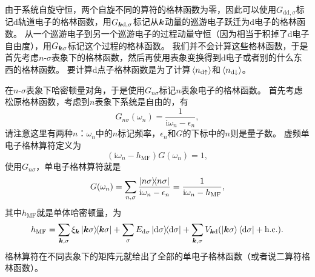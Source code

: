 \documentclass[hyperref, UTF8, a4paper]{ctexart}
\newcommand*{\ii}{\mathrm{i}}
\begin{document}
由于系统自旋守恒，两个自旋不同的算符的格林函数为零，因此可以使用$G_{\text{dd}, \sigma}$标记d轨道电子的格林函数，用$G_{\vb*{k} \text{d}, \sigma}$标记从$\vb*{k}$动量的巡游电子跃迁为d电子的格林函数。
从一个巡游电子到另一个巡游电子的过程动量守恒（因为相当于积掉了d电子自由度），用$G_{\vb*{k}\sigma}$标记这个过程的格林函数。
我们并不会计算这些格林函数，于是首先考虑$n$-$\sigma$表象下的格林函数，然后再使用表象变换得到d电子或者别的什么东西的格林函数。
要计算d点子格林函数是为了计算$\expval*{{n}_{\text{d}\uparrow}}$和$\expval*{{n}_{\text{d}\downarrow}}$。

在$n$-$\sigma$表象下哈密顿量对角，于是使用$G_{n\sigma}$标记$n$表象电子的格林函数。
首先考虑松原格林函数，考虑到$n$表象下系统是自由的，有
\begin{equation}
    G_{n\sigma} (\omega_n) = \frac{1}{\ii \omega_n - \epsilon_n},
\end{equation}
请注意这里有两种$n$：$\omega_n$中的$n$标记频率，$\epsilon_n$和$G$的下标中的$n$则是量子数。
虚频单电子格林算符定义为
\[
    (\ii \omega_n - {h}_\text{MF}) {G}(\omega_n) = 1,
\]
使用$G_{n \sigma}$，单电子格林算符就是
\begin{equation}
    {G}(\omega_n) = \sum_{n, \sigma} \frac{\dyad{n\sigma}}{\ii \omega_n - \epsilon_n} = \frac{1}{\ii \omega_n - {h}_\text{MF}},
\end{equation}
其中${h}_\text{MF}$就是单体哈密顿量，为
\begin{equation}
    {h}_\text{MF} = \sum_{\vb*{k}, \sigma} \xi_{\vb*{k}} \dyad{\vb*{k} \sigma} + \sum_\sigma E_{\text{d} \sigma} \dyad{\text{d} \sigma} + \sum_{\vb*{k}, \sigma} V_{\vb*{k} \text{d}} ( \ket{\vb*{k} \sigma} \bra{\text{d} \sigma} + \text{h.c.} ).
    \label{eq:anderson-green-operator}
\end{equation}
格林算符在不同表象下的矩阵元就给出了全部的单电子格林函数（或者说二算符格林函数）。
\end{document}
